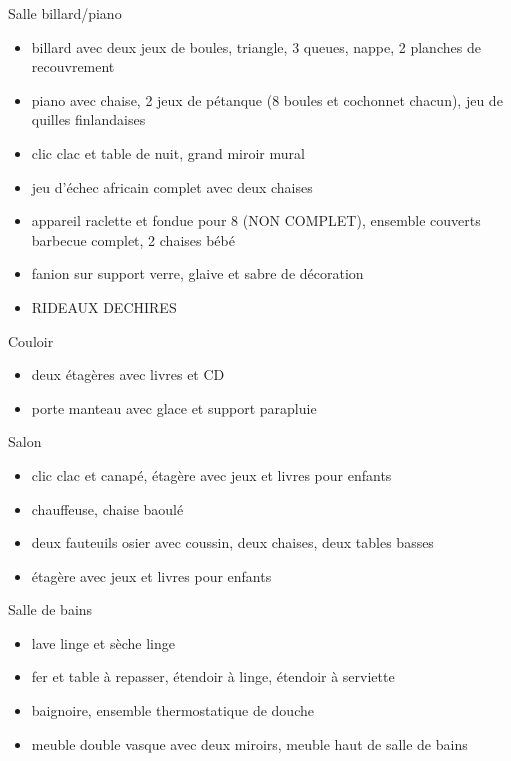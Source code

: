\documentclass[a4paper,11pt]{article}
\begin{document}
\vspace{0.25cm}

Salle billard/piano
\begin{itemize}
\item billard avec deux jeux de boules, triangle, 3 queues, nappe, 2 planches de recouvrement
\item piano avec chaise, 2 jeux de pétanque (8 boules et cochonnet chacun), jeu de quilles finlandaises
\item clic clac et table de nuit, grand miroir mural
\item jeu d'échec africain complet avec deux chaises
\item appareil raclette et fondue pour 8 (NON COMPLET), ensemble couverts barbecue complet, 2 chaises bébé
\item fanion sur support verre, glaive et sabre de décoration
\item RIDEAUX DECHIRES
\end{itemize}

\vspace{0.25cm}

Couloir
\begin{itemize}
\item deux étagères avec livres et CD
\item porte manteau avec glace et support parapluie
\end{itemize}

\vspace{0.25cm}

Salon
\begin{itemize}
\item clic clac et canapé, étagère avec jeux et livres pour enfants
\item chauffeuse, chaise baoulé
\item deux fauteuils osier avec coussin, deux chaises, deux tables basses
\item étagère avec jeux et livres pour enfants
\end{itemize}







\vspace{0.25cm}

Salle de bains
\begin{itemize}
\item lave linge et sèche linge
\item fer et table à repasser, étendoir à linge, étendoir à serviette
\item baignoire, ensemble thermostatique de douche
\item meuble double vasque avec deux miroirs, meuble haut de salle de bains
\end{itemize}
\end{document}
